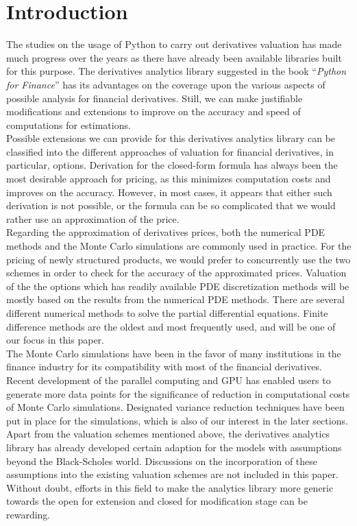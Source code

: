 \section{Introduction}
The studies on the usage of Python to carry out derivatives valuation has made much progress over the years as there have already been available libraries built for this purpose. The derivatives analytics library suggested in the book ``\emph{Python for Finance}'' has its advantages on the coverage upon the various aspects of possible analysis for financial derivatives. Still, we can make justifiable modifications and extensions to improve on the accuracy and speed of computations for estimations. \\[1mm]
Possible extensions we can provide for this derivatives analytics library can be classified into the different approaches of valuation for financial derivatives, in particular, options. Derivation for the closed-form formula has always been the most desirable approach for pricing, as this minimizes computation costs and improves on the accuracy. However, in most cases, it appears that either such derivation is not possible, or the formula can be so complicated that we would rather use an approximation of the price.\\[1mm]
Regarding the approximation of derivatives prices, both the numerical PDE methods and the Monte Carlo simulations are commonly used in practice. For the pricing of newly structured products, we would prefer to concurrently use the two schemes in order to check for the accuracy of the approximated prices. Valuation of the the options which has readily available PDE discretization methods will be mostly based on the results from the numerical PDE methods. There are several different numerical methods to solve the partial differential equations. Finite difference methods are the oldest and most frequently used, and will be one of our focus in this paper.\\[1mm]
The Monte Carlo simulations have been in the favor of many institutions in the finance industry for its compatibility with most of the financial derivatives. Recent development of the parallel computing and GPU has enabled users to generate more data points for the significance of reduction in computational costs of Monte Carlo simulations. Designated variance reduction techniques have been put in place for the simulations, which is also of our interest in the later sections.\\[1mm]
Apart from the valuation schemes mentioned above, the derivatives analytics library has already developed certain adaption for the models with assumptions beyond the Black-Scholes world. Discussions on the incorporation of these assumptions into the existing valuation schemes are not included in this paper. Without doubt, efforts in this field to make the analytics library more generic towards the open for extension and closed for modification stage can be rewarding.
\newpage

